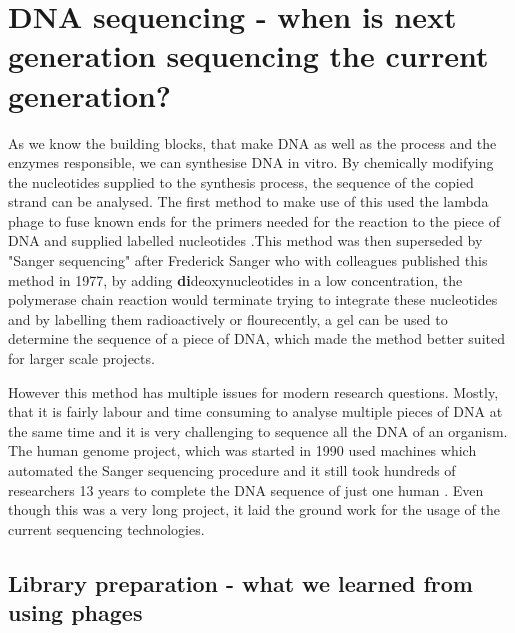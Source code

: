 \section[DNA sequencing]{DNA sequencing - when is next generation sequencing the current generation?}
\label{intro-sec:sequencing}

As we know the building blocks, that make DNA as well as the process and the enzymes responsible, we can synthesise DNA in vitro. By chemically modifying the nucleotides supplied to the synthesis process, the sequence of the copied strand can be analysed. The first method to make use of this used the lambda phage to fuse known ends for the primers needed for the reaction to the piece of DNA and supplied labelled nucleotides \cite{Padmanabhan1974}.This method was then superseded by "Sanger sequencing" after Frederick Sanger who with colleagues published this method in 1977, by adding \textbf{di}deoxynucleotides in a low concentration, the polymerase chain reaction would terminate trying to integrate these nucleotides and by labelling them radioactively or flourecently, a gel can be used to determine the sequence of a piece of DNA\cite{Sanger1975,Sanger1977}, which made the method better suited for larger scale projects.

However this method has multiple issues for modern research questions. Mostly, that it is fairly labour and time consuming to analyse multiple pieces of DNA at the same time and it is very challenging to sequence all the DNA of an organism. The human genome project, which was started in 1990 used machines which automated the Sanger sequencing procedure and it still took hundreds of researchers 13 years to complete the DNA sequence of just one human \cite{Lander2001,Venter2001}. Even though this was a very long project, it laid the ground work for the usage of the current sequencing technologies.

\subsection[Library preparation]{Library preparation - what we learned from using phages}
\label{intro-sec:libraryprep}

